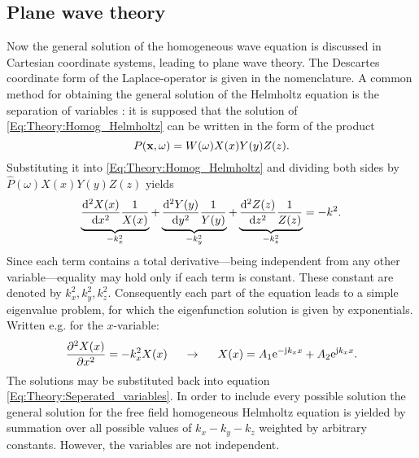 \subsection{Plane wave theory}
Now the general solution of the homogeneous wave equation is discussed in Cartesian coordinate systems, leading to plane wave theory.
The Descartes coordinate form of the Laplace-operator is given in the nomenclature.
A common method for obtaining the general solution of the Helmholtz equation is the separation of variables \cite{Devaney2012}: 
it is supposed that the solution of \eqref{Eq:Theory:Homog_Helmholtz} can be written in the form of the product
\begin{equation}
P(\mathbf{x},\omega) = W(\omega) X(x)Y(y)Z(z).
\label{Eq:Theory:Seperated_variables}
\end{equation}
Substituting it into \eqref{Eq:Theory:Homog_Helmholtz} and dividing both sides by $\hat{P}(\omega) X(x)Y(y)Z(z)$ yields
\begin{equation}
\underbrace{\frac{\mathrm{d}^2 X(x)}{\mathrm{d} x^2}\frac{1}{X(x)}}_{-k_x^2} + 
\underbrace{\frac{\mathrm{d}^2 Y(y)}{\mathrm{d} y^2}\frac{1}{Y(y)}}_{-k_y^2} + 
\underbrace{\frac{\mathrm{d}^2 Z(z)}{\mathrm{d} z^2}\frac{1}{Z(z)}}_{-k_z^2}
= - k^2.
\label{Eq:Theory:Seperated_variables_expanded}
\end{equation}
Since each term contains a total derivative---being independent from any other variable---equality may hold only if each term is constant. 
These constant are denoted by $k_x^2, k_y^2, k_z^2$. 
Consequently each part of the equation leads to a simple eigenvalue problem, for which the eigenfunction solution is given by exponentials. 
Written e.g. for the $x$-variable:
\begin{equation}
\frac{\partial^2 X(x)}{\partial x^2} = -k_x^2 X(x) \hspace{5mm} \rightarrow \hspace{5mm} X(x) = A_1 \mathrm{e}^{-\mathrm{j} k_x x} + A_2 \mathrm{e}^{\mathrm{j} k_x x}.
\end{equation}
The solutions may be substituted back into equation \eqref{Eq:Theory:Seperated_variables}. 
In order to include every possible solution the general solution for the free field homogeneous Helmholtz equation is yielded by summation over all possible values of $k_x-k_y-k_z$ weighted by arbitrary constants. 
However, the variables are not independent. 
